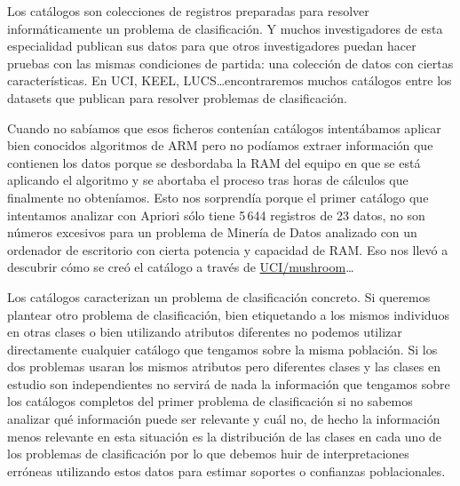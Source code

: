 Los catálogos son colecciones de registros preparadas para resolver informáticamente un problema de clasificación. Y muchos investigadores de esta especialidad publican sus datos para que otros investigadores puedan hacer pruebas con las mismas condiciones de partida: una colección de datos con ciertas características. En UCI, KEEL, LUCS\ldots encontraremos muchos catálogos entre los datasets que publican para resolver problemas de clasificación.

Cuando no sabíamos que esos ficheros contenían catálogos intentábamos aplicar bien conocidos algoritmos de ARM pero no podíamos extraer información que contienen los datos porque se desbordaba la RAM del equipo en que se está aplicando el algoritmo y se abortaba el proceso tras horas de cálculos que finalmente no obteníamos. Esto nos sorprendía porque el primer catálogo que intentamos analizar con Apriori sólo tiene 5\,644 registros de 23 datos, no son números excesivos para un problema de Minería de Datos analizado con un ordenador de escritorio con cierta potencia y capacidad de RAM. Eso nos llevó a descubrir cómo se creó el catálogo a través de \url{UCI/mushroom}\ldots

Los catálogos caracterizan un problema de clasificación concreto. Si queremos plantear otro problema de clasificación, bien etiquetando a los mismos individuos en otras clases o bien utilizando atributos diferentes no podemos utilizar directamente cualquier catálogo que tengamos sobre la misma población. Si los dos problemas usaran los mismos atributos pero diferentes clases y las clases en estudio son independientes no servirá de nada la información que tengamos sobre los catálogos completos del primer problema de clasificación si no sabemos analizar qué información puede ser relevante y cuál no, de hecho la información menos relevante en esta situación es la distribución de las clases en cada uno de los problemas de clasificación por lo que debemos huir de interpretaciones erróneas utilizando estos datos para estimar soportes o confianzas poblacionales.

